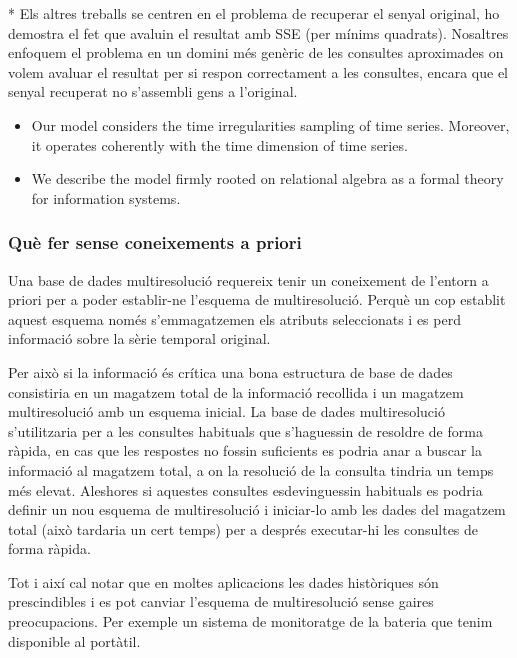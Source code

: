 * Els altres treballs se centren en el problema de recuperar el senyal original, ho demostra el fet que avaluin el resultat amb SSE (per mínims quadrats). Nosaltres enfoquem el problema en un domini més genèric de les consultes aproximades on volem avaluar el resultat per si respon correctament a les consultes, encara que el senyal recuperat no s'assembli gens a l'original.

\begin{itemize}
\item Our model considers the time irregularities sampling of time
  series. Moreover, it operates coherently with the time dimension of
  time series.

\item We describe the model firmly rooted on relational algebra as a formal
  theory for information systems.

\end{itemize}









\subsubsection{Què fer sense coneixements a priori}

Una base de dades multiresolució requereix tenir un coneixement de l'entorn a priori per a poder establir-ne l'esquema de multiresolució. Perquè un cop establit aquest esquema només s'emmagatzemen els atributs seleccionats i es perd informació sobre la sèrie temporal original.

Per això si la informació és crítica una bona estructura de base de dades consistiria en un magatzem total de la informació recollida i un magatzem multiresolució amb un esquema inicial. La base de dades multiresolució s'utilitzaria per a les consultes habituals que s'haguessin de resoldre de forma ràpida, en cas que les respostes no fossin suficients es podria anar a buscar la informació al magatzem total, a on la resolució de la consulta tindria un temps més elevat. 
Aleshores si aquestes consultes esdevinguessin habituals es podria definir un nou esquema de multiresolució i iniciar-lo amb les dades del magatzem total (això tardaria un cert temps) per a després executar-hi les consultes de forma ràpida.


Tot i així cal notar que en moltes aplicacions les dades històriques
són prescindibles i es pot canviar l'esquema de multiresolució sense
gaires preocupacions. Per exemple un sistema de monitoratge de la
bateria que tenim disponible al portàtil.

